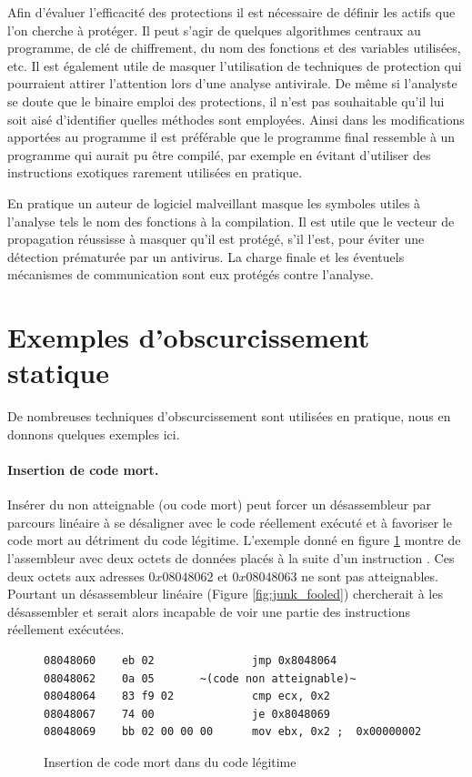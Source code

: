 Afin d'évaluer l'efficacité des protections il est nécessaire de définir les actifs que l'on cherche à protéger. 
Il peut s'agir de quelques algorithmes centraux au programme, de clé de chiffrement, du nom des fonctions et des variables utilisées, etc.
Il est également utile de masquer l'utilisation de techniques de protection qui pourraient attirer l'attention lors d'une analyse antivirale. De même si l'analyste se doute que le binaire emploi des protections, il n'est pas souhaitable qu'il lui soit aisé d'identifier quelles méthodes sont employées. Ainsi dans les modifications apportées au programme il est préférable que le programme final ressemble à un programme qui aurait pu être compilé, par exemple en évitant d'utiliser des instructions exotiques rarement utilisées en pratique.


En pratique un auteur de logiciel malveillant masque les symboles utiles à l'analyse tels le nom des fonctions à la compilation. Il est utile que le vecteur de propagation réussisse à masquer qu'il est protégé, s'il l'est, pour éviter une détection prématurée par un antivirus. La charge finale et les éventuels mécanismes de communication sont eux protégés contre l'analyse.

\section{Exemples d'obscurcissement statique}
De nombreuses techniques d'obscurcissement sont utilisées en pratique, nous en donnons quelques exemples ici.

\paragraph{Insertion de code mort.}
Insérer du non atteignable (ou code mort) peut forcer un désassembleur par parcours linéaire à se désaligner avec le code réellement exécuté et à favoriser le code mort au détriment du code légitime.
L'exemple donné en figure \ref{fig:junk_right} montre de l'assembleur avec deux octets de données placés à la suite d'un instruction \jmp. Ces deux octets aux adresses $0x08048062$ et $0x08048063$ ne sont pas atteignables. Pourtant un désassembleur linéaire (Figure \ref{fig:junk_fooled}) chercherait à les désassembler et serait alors incapable de voir une partie des instructions réellement exécutées.


\begin{figure}
\begin{lstlisting}[language={[x86masm]Assembler}, escapechar=~]
08048060    eb 02               jmp 0x8048064
08048062    0a 05		~(code non atteignable)~
08048064    83 f9 02            cmp ecx, 0x2
08048067    74 00               je 0x8048069
08048069    bb 02 00 00 00      mov ebx, 0x2 ;  0x00000002
\end{lstlisting}
\caption{Insertion de code mort dans du code légitime}
\label{fig:junk_right}
\end{figure}

